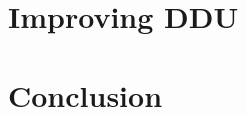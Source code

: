 \documentclass[twoside,a4paper,11pt]{memoir}
\begin{document}




\chapter{Improving DDU}

\chapter{Conclusion}
\label{ch:conclusion}




\end{document}
